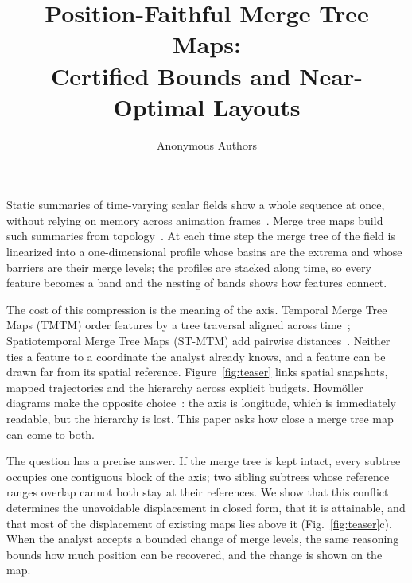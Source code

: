 \documentclass[review]{vgtc}                 %
\title{Position-Faithful Merge Tree Maps:\\Certified Bounds and Near-Optimal Layouts}
\author{Anonymous Authors}\onlineid{0}\vgtccategory{Research}\vgtcinsertpkg
\begin{document}
\maketitle

Static summaries of time-varying scalar fields show a whole sequence at once, without relying on memory across animation frames~\cite{Tversky:2002:Animation,Robertson:2008:Animation,Archambault:2011:AMM}. Merge tree maps build such summaries from topology~\cite{Koepp:2023:TMTM,STMTM:2026}. At each time step the merge tree of the field is linearized into a one-dimensional profile whose basins are the extrema and whose barriers are their merge levels; the profiles are stacked along time, so every feature becomes a band and the nesting of bands shows how features connect.

The cost of this compression is the meaning of the axis. Temporal Merge Tree Maps (TMTM) order features by a tree traversal aligned across time~\cite{Koepp:2023:TMTM}; Spatiotemporal Merge Tree Maps (ST-MTM) add pairwise distances~\cite{STMTM:2026}. Neither ties a feature to a coordinate the analyst already knows, and a feature can be drawn far from its spatial reference. Figure~\ref{fig:teaser} links spatial snapshots, mapped trajectories and the hierarchy across explicit budgets. Hovm\"oller diagrams make the opposite choice~\cite{Hovmoller:1949}: the axis is longitude, which is immediately readable, but the hierarchy is lost. This paper asks how close a merge tree map can come to both.

The question has a precise answer. If the merge tree is kept intact, every subtree occupies one contiguous block of the axis; two sibling subtrees whose reference ranges overlap cannot both stay at their references. We show that this conflict determines the unavoidable displacement in closed form, that it is attainable, and that most of the displacement of existing maps lies above it (Fig.~\ref{fig:teaser}c). When the analyst accepts a bounded change of merge levels, the same reasoning bounds how much position can be recovered, and the change is shown on the map.
\end{document}
